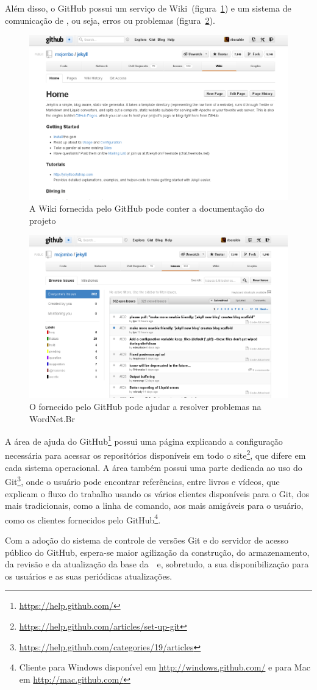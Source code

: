 Além disso, o GitHub possui um serviço de Wiki~(figura~\ref{github:wiki}) e um
sistema de comunicação de , ou seja, erros ou problemas
(figura~\ref{github:bugtracker}).

\begin{figure}[h]
  \centering
  \includegraphics[width=.9\textwidth]{img/wiki.png}
  \caption{A Wiki fornecida pelo GitHub pode conter a documentação do projeto}
  \label{github:wiki}
\end{figure}

\begin{figure}[h]
  \centering
  \includegraphics[width=.9\textwidth]{img/bugtracker.png}
  \caption{O  fornecido pelo GitHub pode ajudar a resolver problemas na WordNet.Br}
  \label{github:bugtracker}
\end{figure}

A área de ajuda do GitHub\footnote{\url{https://help.github.com/}} possui uma
página explicando a configuração necessária para acessar os repositórios
disponíveis em todo o
site\footnote{\url{https://help.github.com/articles/set-up-git}}, que difere em
cada sistema operacional. A área também possui uma parte dedicada ao uso do
Git\footnote{\url{https://help.github.com/categories/19/articles}}, onde o
usuário pode encontrar referências, entre livros e vídeos, que explicam o fluxo
do trabalho usando os vários clientes disponíveis para o Git, dos mais
tradicionais, como a linha de comando, aos mais amigáveis para o usuário, como
os clientes fornecidos pelo GitHub\footnote{Cliente para Windows disponível em
\url{http://windows.github.com/} e para Mac em \url{http://mac.github.com/}}.

Com a adoção do sistema de controle de versões Git e do servidor de acesso
público do GitHub, espera-se maior agilização da construção, do armazenamento,
da revisão e da atualização da base da~\wnbr\ e, sobretudo, a sua
disponibilização para os usuários e as suas periódicas atualizações.
